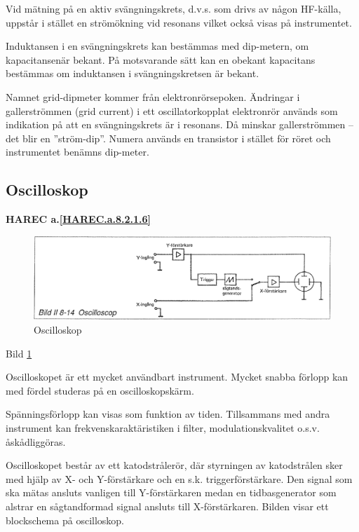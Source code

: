 Vid mätning på en aktiv svängningskrets, d.v.s. som drivs av någon
HF-källa, uppstår i stället en strömökning vid resonans vilket också
visas på instrumentet.

Induktansen i en svängningskrets kan bestämmas med dip-metern, om
kapacitansenär bekant. På motsvarande sätt kan en obekant kapacitans
bestämmas om induktansen i svängningskretsen är bekant.

Namnet grid-dipmeter kommer från elektronrörsepoken. Ändringar i
gallerströmmen (grid current) i ett oscillatorkopplat elektronrör
används som indikation på att en svängningskrets är i resonans. Då
minskar gallerströmmen -- det blir en ''ström-dip''. Numera används en
transistor i stället för röret och instrumentet benämns dip-meter.

\subsection{Oscilloskop}
\textbf{
HAREC a.\ref{HAREC.a.8.2.1.6}\label{myHAREC.a.8.2.1.6}
}

\begin{rev-omarbetas}
\begin{figure}
  \includegraphics[width=\textwidth]{images/bild_2_8-14}
  \caption{Oscilloskop}
  \label{fig:bildII8-14}
\end{figure}

Bild \ref{fig:bildII8-14}

Oscilloskopet är ett mycket användbart instrument. Mycket snabba
förlopp kan med fördel studeras på en oscilloskopskärm.

Spänningsförlopp kan visas som funktion av tiden. Tillsammans med
andra instrument kan frekvenskaraktäristiken i filter,
modulationskvalitet o.s.v. åskådliggöras.

Oscilloskopet består av ett katodstrålerör, där styrningen av
katodstrålen sker med hjälp av X- och Y-förstärkare och en s.k.
triggerförstärkare. Den signal som ska mätas ansluts vanligen till
Y-förstärkaren medan en tidbasgenerator som alstrar en sågtandformad
signal ansluts till X-förstärkaren.  Bilden visar ett blockschema på
oscilloskop.
\end{rev-omarbetas}

